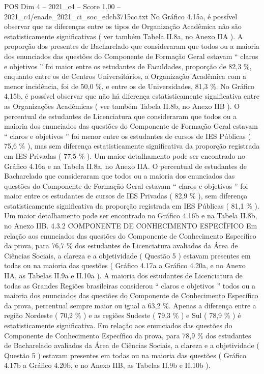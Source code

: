\begin{textsample}{POS Dim 4 – 2021\_c4 – Score 1.00 – 2021\_c4/enade\_2021\_ci\_soc\_edcb3715cc.txt}
No Gráfico 4.15a, é possível observar que as diferenças entre os tipos de Organização Acadêmica não são estatisticamente significativas ( ver também Tabela II.8a, no Anexo IIA ).
A proporção dos presentes de Bacharelado que consideraram que todos ou a maioria dos enunciados das questões do Componente de Formação Geral estavam “ claros e objetivos ” foi maior entre os estudantes de Faculdades, proporção de 82,3 \%, enquanto entre os de Centros Universitários, a Organização Acadêmica com a menor incidência, foi de 50,0 \%, e entre os de Universidades, 81,3 \%.
No Gráfico 4.15b, é possível observar que não há diferença estatisticamente significativa entre as Organizações Acadêmicas ( ver também Tabela II.8b, no Anexo IIB ).
O percentual de estudantes de Licenciatura que consideraram que todos ou a maioria dos enunciados das questões do Componente de Formação Geral estavam “ claros e objetivos ” foi menor entre os estudantes de cursos de IES Públicas ( 75,6 \% ), mas sem diferença estatisticamente significativa da proporção registrada em IES Privadas ( 77,5 \% ).
Um maior detalhamento pode ser encontrado no Gráfico 4.16a e na Tabela II.8a, no Anexo IIA.
O percentual de estudantes de Bacharelado que consideraram que todos ou a maioria dos enunciados das questões do Componente de Formação Geral estavam “ claros e objetivos ” foi maior entre os estudantes de cursos de IES Privadas ( 82,9 \% ), sem diferença estatisticamente significativa da proporção registrada em IES Públicas ( 81,1 \% ).
Um maior detalhamento pode ser encontrado no Gráfico 4.16b e na Tabela II.8b, no Anexo IIB. 4.3.2 COMPONENTE DE CONHECIMENTO ESPECÍFICO Em relação aos enunciados das questões do Componente de Conhecimento Específico da prova, para 76,7 \% dos estudantes de Licenciatura avaliados da Área de Ciências Sociais, a clareza e a objetividade ( Questão 5 ) estavam presentes em todas ou na maioria das questões ( Gráfico 4.17a a Gráfico 4.20a, e no Anexo IIA, as Tabelas II.9a e II.10a ).
A maioria dos estudantes de Licenciatura de todas as Grandes Regiões brasileiras considerou “ claros e objetivos ” todos ou a maioria dos enunciados das questões do Componente de Conhecimento Específico da prova, percentual sempre maior ou igual a 63,2 \%.
Apenas a diferença entre a região Nordeste ( 70,2 \% ) e as regiões Sudeste ( 79,3 \% ) e Sul ( 78,9 \% ) é estatisticamente significativa.
Em relação aos enunciados das questões do Componente de Conhecimento Específico da prova, para 78,9 \% dos estudantes de Bacharelado avaliados da Área de Ciências Sociais, a clareza e a objetividade ( Questão 5 ) estavam presentes em todas ou na maioria das questões ( Gráfico 4.17b a Gráfico 4.20b, e no Anexo IIB, as Tabelas II.9b e II.10b ).

\end{textsample}
